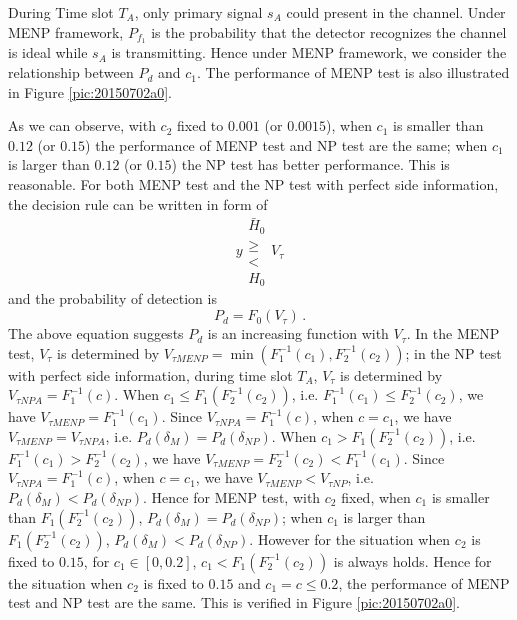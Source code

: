 During Time slot $T_A$, only primary signal $s_A$ could present in the channel. Under MENP framework, $P_{f_1}$ is the probability that the detector recognizes the channel is ideal while $s_A$ is transmitting. 
Hence under MENP framework, we consider the relationship between $P_d$ and $c_1$. The performance of MENP test is also illustrated in Figure \ref{pic:20150702a0}.  

As we can observe, with $c_2$  fixed to $0.001$ (or $0.0015$), when $c_1$ is smaller than $0.12$ (or $0.15$) the performance of MENP test and NP test are the same; when $c_1$ is larger than $0.12$ (or $0.15$) the NP test has better performance. This is reasonable.  
For both MENP test and the NP test with perfect side information, the decision rule can be written in form of
\begin{equation}
  y  \substack{\bar{H}_0 \\ \geq \\ < \\ H_0} V_\tau
\end{equation}
and the probability of detection is 
\begin{equation}
  P_d = F_0(V_\tau)\,.
\end{equation}
The above equation suggests $P_d$ is an increasing function with $V_\tau$. 
In the MENP test, $V_\tau$ is determined by $V_{\tau MENP}= \min (F_1^{-1}(c_1), F_2^{-1}(c_2))$; in the NP test with perfect side information, during time slot $T_A$, $V_\tau$ is determined by $V_{\tau NP A} = F_1^{-1}(c)$. When $c_1 \leq F_1(F_2^{-1}(c_2))$, i.e. $F_1^{-1}(c_1) \leq  F_2^{-1}(c_2)$, we have  $V_{\tau MENP} = F_1^{-1}(c_1)$. Since $V_{\tau NP A} = F_1^{-1}(c)$, when $c = c_1$, we have $V_{\tau MENP} = V_{\tau NPA}$, i.e.  $P_d(\delta_M) = P_d(\delta_{NP})$.    
When $c_1 > F_1(F_2^{-1}(c_2))$, i.e. $F_1^{-1}(c_1) > F_2^{-1}(c_2)$, we have  $V_{\tau MENP} = F_2^{-1}(c_2) < F_1^{-1}(c_1)$. Since $V_{\tau NP A} = F_1^{-1}(c)$, when $c = c_1$, we have 
$V_{\tau MENP} < V_{\tau NP}$, i.e.  $P_d(\delta_M) < P_d(\delta_{NP})$.
Hence for MENP test, with $c_2$ fixed, when $c_1$ is smaller than $F_1( F_2^{-1}(c_2) ) $, $P_d(\delta_M) = P_d(\delta_{NP})$; when $c_1$ is larger than $ F_1( F_2^{-1}(c_2))$, $P_d(\delta_M) < P_d(\delta_{NP})$. 
However for the situation when  $c_2$ is fixed to $0.15$, for $c_1 \in [0, 0.2]$, $c_1 <  F_1(F_2^{-1}(c_2))$ is always holds. Hence for the situation when $c_2$ is fixed to $0.15$ and $c_1 = c \leq 0.2$, the performance of MENP test and NP test are the same. This is verified in Figure \ref{pic:20150702a0}. 

